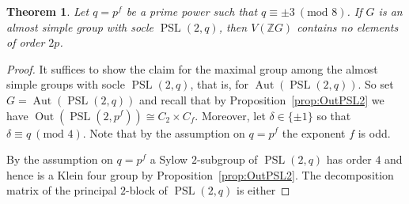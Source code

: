 \documentclass[11pt, a4paper]{amsart}
\newtheorem{theorem}{Theorem}[section]
\theoremstyle{definition}
\theoremstyle{definition}
\newcommand{\Aut}{\operatorname{Aut}}
\newcommand{\Out}{\operatorname{Out}}
\newcommand{\PSL}{{\operatorname{PSL}}}
\begin{document}
\begin{theorem}\label{th:PSLOrder2p}
Let $q=p^f$ be a prime power such that $q \equiv \pm 3\ (\textrm{mod } 8)$. If $G$ is an almost simple group with socle $\PSL(2,q)$, then $V(\mathbb{Z}G)$ contains no elements of order $2p$.
\end{theorem}
\begin{proof}
It suffices to show the claim for the maximal group among the almost simple groups with socle $\PSL(2,q)$, that is, for $\Aut(\PSL(2,q))$. So set $G = \Aut(\PSL(2,q))$ and recall that by Proposition~\ref{prop:OutPSL2} we have $\Out(\PSL(2,p^f)) \cong C_2 \times C_f$. Moreover, let $\delta \in \{ \pm 1\}$ so that $\delta \equiv q\ (\textrm{mod } 4)$. Note that by the assumption on $q=p^f$ the exponent $f$ is odd.

By the assumption on $q=p^f$ a Sylow $2$-subgroup of $\PSL(2,q)$ has order $4$ and hence is a Klein four group by Proposition~\ref{prop:OutPSL2}.
The decomposition matrix of the principal $2$-block of $\PSL(2,q)$ is either  

\end{proof}
\end{document}
